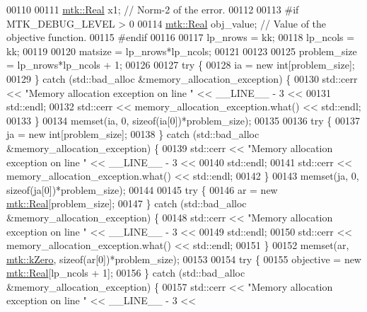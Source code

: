 \begin{DoxyCode}
00110 
00111   \hyperlink{group__c01-roots_gac080bbbf5cbb5502c9f00405f894857d}{mtk::Real} x1;             \textcolor{comment}{// Norm-2 of the error.}
00112 
00113 \textcolor{preprocessor}{  #if MTK\_DEBUG\_LEVEL > 0}
00114   \hyperlink{group__c01-roots_gac080bbbf5cbb5502c9f00405f894857d}{mtk::Real} obj\_value;      \textcolor{comment}{// Value of the objective function.}
00115 \textcolor{preprocessor}{  #endif}
00116 
00117   lp\_nrows = kk;
00118   lp\_ncols = kk;
00119 
00120   matsize = lp\_nrows*lp\_ncols;
00121 
00123 
00125   problem\_size = lp\_nrows*lp\_ncols + 1;
00126 
00127   \textcolor{keywordflow}{try} \{
00128     ia = \textcolor{keyword}{new} \textcolor{keywordtype}{int}[problem\_size];
00129   \} \textcolor{keywordflow}{catch} (std::bad\_alloc &memory\_allocation\_exception) \{
00130     std::cerr << \textcolor{stringliteral}{"Memory allocation exception on line "} << \_\_LINE\_\_ - 3 <<
00131       std::endl;
00132     std::cerr << memory\_allocation\_exception.what() << std::endl;
00133   \}
00134   memset(ia, 0, \textcolor{keyword}{sizeof}(ia[0])*problem\_size);
00135 
00136   \textcolor{keywordflow}{try} \{
00137     ja = \textcolor{keyword}{new} \textcolor{keywordtype}{int}[problem\_size];
00138   \} \textcolor{keywordflow}{catch} (std::bad\_alloc &memory\_allocation\_exception) \{
00139     std::cerr << \textcolor{stringliteral}{"Memory allocation exception on line "} << \_\_LINE\_\_ - 3 <<
00140       std::endl;
00141     std::cerr << memory\_allocation\_exception.what() << std::endl;
00142   \}
00143   memset(ja, 0, \textcolor{keyword}{sizeof}(ja[0])*problem\_size);
00144 
00145   \textcolor{keywordflow}{try} \{
00146     ar = \textcolor{keyword}{new} \hyperlink{group__c01-roots_gac080bbbf5cbb5502c9f00405f894857d}{mtk::Real}[problem\_size];
00147   \} \textcolor{keywordflow}{catch} (std::bad\_alloc &memory\_allocation\_exception) \{
00148     std::cerr << \textcolor{stringliteral}{"Memory allocation exception on line "} << \_\_LINE\_\_ - 3 <<
00149       std::endl;
00150     std::cerr << memory\_allocation\_exception.what() << std::endl;
00151   \}
00152   memset(ar, \hyperlink{group__c01-roots_ga59a451a5fae30d59649bcda274fea271}{mtk::kZero}, \textcolor{keyword}{sizeof}(ar[0])*problem\_size);
00153 
00154   \textcolor{keywordflow}{try} \{
00155     objective = \textcolor{keyword}{new} \hyperlink{group__c01-roots_gac080bbbf5cbb5502c9f00405f894857d}{mtk::Real}[lp\_ncols + 1];
00156   \} \textcolor{keywordflow}{catch} (std::bad\_alloc &memory\_allocation\_exception) \{
00157     std::cerr << \textcolor{stringliteral}{"Memory allocation exception on line "} << \_\_LINE\_\_ - 3 <<

\end{DoxyCode}
